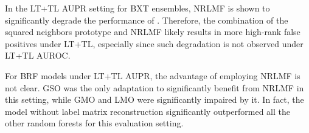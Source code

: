 In the LT+TL AUPR setting for BXT ensembles, NRLMF is shown to significantly degrade the performance of . Therefore, the combination of the squared neighbors prototype and NRLMF likely results in more high-rank false positives under LT+TL, especially since such degradation is not observed under LT+TL AUROC.  %
%



%

For BRF models under LT+TL AUPR, the advantage of employing NRLMF is not clear. GSO was the only adaptation to significantly benefit from NRLMF in this setting, while GMO and LMO were significantly impaired by it. In fact, the  model without label matrix reconstruction significantly outperformed all the other random forests for this evaluation setting.


